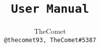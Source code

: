 \author{%
    TheComet\\
    \texttt{@thecomet93, TheComet\#5387}
}

\title{%
    \textbf{\Huge{\texttt{User Manual}}} \\
}

